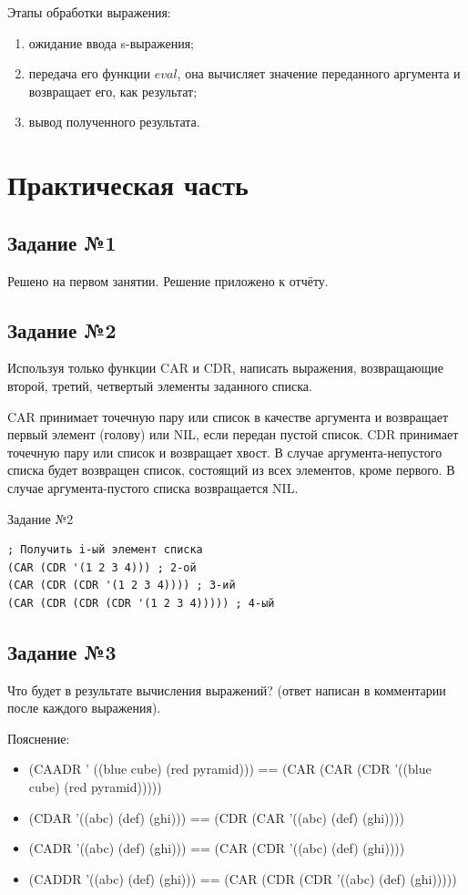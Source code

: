 Этапы обработки выражения:
\begin{enumerate}
	\item ожидание ввода s-выражения;
	\item передача его функции $eval$, она вычисляет значение переданного аргумента и возвращает его, как результат;
	\item вывод полученного результата.
\end{enumerate}


\newpage

\chapter{Практическая часть}
\section{Задание №1}
Решено на первом занятии. Решение приложено к отчёту.

\section{Задание №2}
Используя только функции CAR и CDR, написать выражения, возвращающие второй, третий, четвертый элементы заданного списка.

CAR принимает точечную пару или список в качестве аргумента и возвращает первый элемент (голову) или NIL, если передан пустой список. CDR принимает точечную пару или список и возвращает хвост. В случае аргумента-непустого списка будет возвращен список, состоящий из всех элементов, кроме первого. В случае аргумента-пустого списка возвращается NIL.

\begin{code}
\caption{Задание №2}
\label{code:bf2}
\begin{verbatim}
; Получить i-ый элемент списка
(CAR (CDR '(1 2 3 4))) ; 2-ой
(CAR (CDR (CDR '(1 2 3 4)))) ; 3-ий
(CAR (CDR (CDR (CDR '(1 2 3 4))))) ; 4-ый
\end{verbatim}
\end{code}

\section{Задание №3}
Что будет в результате вычисления выражений? (ответ написан в комментарии после каждого выражения).

Пояснение:
\begin{itemize}
	\item (CAADR ' ((blue cube) (red pyramid))) == (CAR (CAR (CDR '((blue cube) (red pyramid)))))
	\item (CDAR '((abc) (def) (ghi))) == (CDR (CAR '((abc) (def) (ghi))))
	\item (CADR '((abc) (def) (ghi))) == (CAR (CDR '((abc) (def) (ghi))))
	\item (CADDR '((abc) (def) (ghi))) == (CAR (CDR (CDR '((abc) (def) (ghi)))))
\end{itemize}

